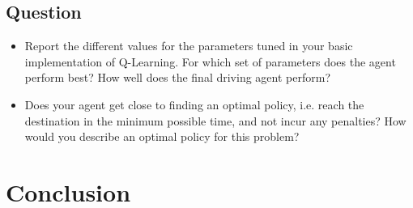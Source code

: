 \documentclass[twoside,openright,titlepage,numbers=noenddot,headinclude,%
               footinclude=true,cleardoublepage=empty,abstractoff,BCOR=5mm,%
               paper=a4,fontsize=11pt,ngerman,american]{scrreprt}
\numberwithin{theorem}{chapter}
\numberwithin{definition}{chapter}
\numberwithin{algorithm}{chapter}
\numberwithin{figure}{chapter}
\numberwithin{table}{chapter}
\numberwithin{equation}{chapter}
\begin{document}
\section*{Question}

\begin{itemize}
\item Report the different values for the parameters tuned in your basic implementation of Q-Learning. For which set of parameters does the agent perform best? How well does the final driving agent perform?
\item Does your agent get close to finding an optimal policy, i.e. reach the destination in the minimum possible time, and not incur any penalties? How would you describe an optimal policy for this problem?

\end{itemize}

%
%

\chapter*{Conclusion}
\end{document}
